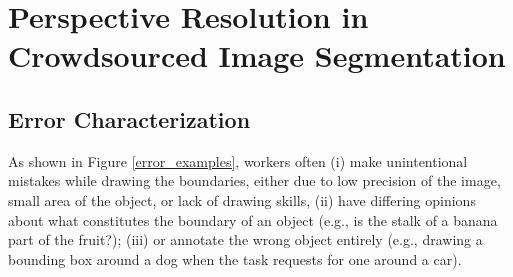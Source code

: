 \section{Perspective Resolution in Crowdsourced Image Segmentation}
\subsection{Error Characterization}
\par As shown in Figure \ref{error_examples}, workers often (i) make unintentional mistakes while drawing the boundaries, either due to low precision of the image, small area of the object, or lack of drawing skills, (ii) have differing opinions about what constitutes the boundary of an object (e.g., is the stalk of a banana part of the fruit?); (iii) or annotate the wrong object entirely (e.g., drawing a bounding box around a dog when the task requests for one around a car). 


